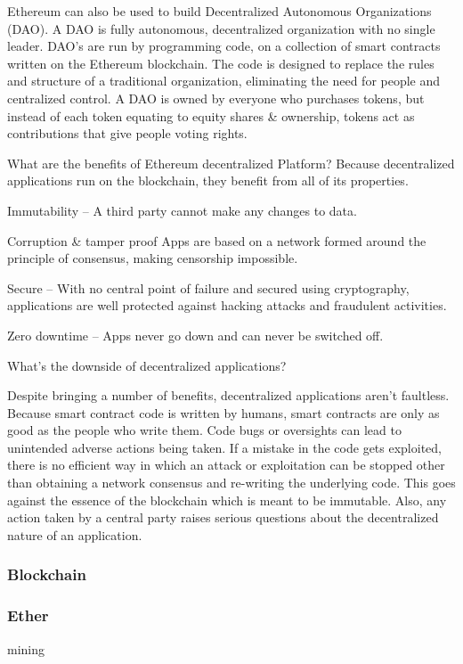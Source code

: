 \documentclass{article}
\begin{document}
Ethereum can also be used to build Decentralized Autonomous Organizations (DAO). A DAO is fully autonomous, decentralized organization with no single leader. DAO’s are run by programming code, on a collection of smart contracts written on the Ethereum blockchain. The code is designed to replace the rules and structure of a traditional organization, eliminating the need for people and centralized control. A DAO is owned by everyone who purchases tokens, but instead of each token equating to equity shares \& ownership, tokens act as contributions that give people voting rights.

What are the benefits of Ethereum decentralized Platform?
Because decentralized applications run on the blockchain, they benefit from all of its properties.

Immutability – A third party cannot make any changes to data.

Corruption \& tamper proof Apps are based on a network formed around the principle of consensus, making censorship impossible.

Secure – With no central point of failure and secured using cryptography, applications are well protected against hacking attacks and fraudulent activities.

Zero downtime – Apps never go down and can never be switched off.

What’s the downside of decentralized applications?

Despite bringing a number of benefits, decentralized applications aren’t faultless. Because smart contract code is written by humans, smart contracts are only as good as the people who write them. Code bugs or oversights can lead to unintended adverse actions being taken. If a mistake in the code gets exploited, there is no efficient way in which an attack or exploitation can be stopped other than obtaining a network consensus and re-writing the underlying code. This goes against the essence of the blockchain which is meant to be immutable. Also, any action taken by a central party raises serious questions about the decentralized nature of an application.

 

\cleardoublepage
\subsubsection{Blockchain}


\cleardoublepage
\subsubsection{Ether}
mining
\end{document}
